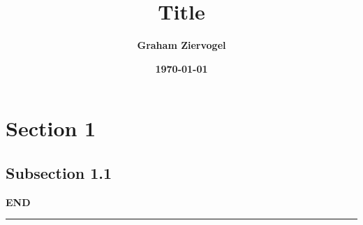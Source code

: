 \documentclass[a4paper]{article}
\title{\bf{Title}}
\author{\bf{Graham Ziervogel}}
\date{\bf{\today}}
\begin{document}
\maketitle

\newpage

\section{Section 1}

\subsection*{Subsection 1.1}

\begin{center}
\bf{END} \\
\end{center}
\vspace{0.5cm}
\hrule
\end{document}
